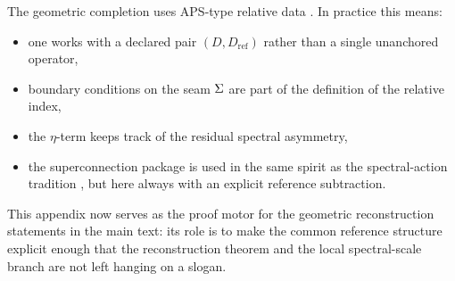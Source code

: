 The geometric completion uses APS-type relative data \cite{aps1975}. In practice this means:
\begin{itemize}[leftmargin=1.5em, topsep=3pt, itemsep=2pt]
    \item one works with a declared pair $(D,D_{\mathrm{ref}})$ rather than a single unanchored operator,
    \item boundary conditions on the seam $\Sigma$ are part of the definition of the relative index,
    \item the $\eta$-term keeps track of the residual spectral asymmetry,
    \item the superconnection package is used in the same spirit as the spectral-action tradition \cite{chamseddineConnes1997}, but here always with an explicit reference subtraction.
\end{itemize}

This appendix now serves as the proof motor for the geometric reconstruction statements in the main text: its role is to make the common reference structure explicit enough that the reconstruction theorem and the local spectral-scale branch are not left hanging on a slogan.

